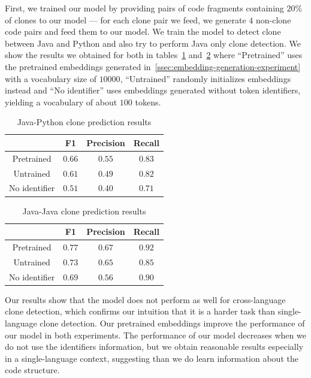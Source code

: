 \documentclass[11pt,a4paper,twocolumn]{article}
\begin{document}
First, we trained our model by providing pairs of code fragments containing
$20$\% of clones to our model --- for each clone pair we feed, we generate $4$
non-clone code pairs and feed them to our model. We train the model to detect
clone between Java and Python and also try to perform Java only clone
detection. We show the results we obtained for both in
tables~\ref{tab:java-python-results} and~\ref{tab:java-java-results} where
``Pretrained'' uses the pretrained embeddings generated
in~\ref{ssec:embedding-generation-experiment} with a vocabulary size of $10000$,
``Untrained'' randomly initializes embeddings instead and ``No identifier'' uses
embeddings generated without token identifiers, yielding a vocabulary of
about $100$ tokens.

\begin{table}
  \caption{\label{tab:java-python-results}Java-Python clone prediction results}
  \centering
  \begin{tabular}{c c c c}
    & F1 & Precision & Recall\\
    \hline%
    Pretrained & $0.66$ & $0.55$ & $0.83$\\
    Untrained & $0.61$ & $0.49$ & $0.82$\\
    No identifier & $0.51$ & $0.40$ & $0.71$
  \end{tabular}
  \vskip -5mm
\end{table}
%
\begin{table}
  \caption{\label{tab:java-java-results}Java-Java clone prediction results}
  \centering
  \begin{tabular}{c c c c}
    & F1 & Precision & Recall\\
    \hline%
    Pretrained & $0.77$ & $0.67$ & $0.92$\\
    Untrained & $0.73$ & $0.65$ & $0.85$\\
    No identifier & $0.69$ & $0.56$ & $0.90$
  \end{tabular}
  \vskip -5mm
\end{table}

Our results show that the model does not perform as well for cross-language
clone detection, which confirms our intuition that it is a harder task than
single-language clone detection. Our pretrained embeddings improve the
performance of our model in both experiments. The performance of our model
decreases when we do not use the identifiers information, but we obtain
reasonable results especially in a single-language context, suggesting than we
do learn information about the code structure.
\end{document}
